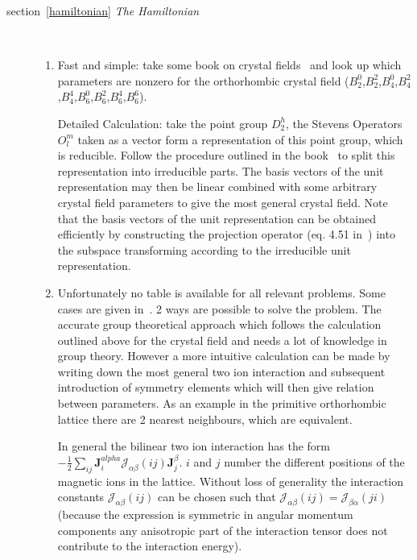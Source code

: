 \documentclass[twoside]{article}
\newcommand{\mbf}[1]{\mathbf #1}
\begin{document}
\begin{description}
\item[section~\ref{hamiltonian} {\em The Hamiltonian}] \ 
 \begin{enumerate}
 \item Fast and simple: take some book on crystal fields~\cite{hutchings64-227} and look up which parameters are nonzero 
 for the orthorhombic crystal field ($B_2^0$,$B_2^2$,$B_4^0$,$B_4^2$,$B_4^4$,$B_6^0$,$B_6^2$,$B_6^4$,$B_6^6$).

 Detailed Calculation: take the point group $D_2^h$, the Stevens Operators $O_l^m$ taken as a vector form
 a representation of this point group, which is reducible. Follow the procedure outlined in the book~\cite{elliott79-1}
 to split this representation into irreducible parts. The basis vectors of the unit representation may then be 
 linear combined with some arbitrary crystal field parameters to give the most general crystal field.
 Note that the basis vectors of the unit representation can be obtained efficiently by constructing the
 projection operator (eq. 4.51 in~\cite{elliott79-1})
  into the subspace transforming according to the irreducible unit representation. 
 \item Unfortunately no table is available for all relevant problems. Some cases are given in~\cite{morin90-1}.
 2 ways are possible to solve the problem. The accurate group theoretical approach which follows the calculation
 outlined above for the crystal field  and needs a lot of knowledge in group theory. However a more intuitive %
calculation
 can be made by writing down the most general two ion interaction and subsequent introduction of symmetry elements which
 will then give relation between parameters. As an example in the primitive orthorhombic lattice there are 2 nearest %
neighbours, which
 are equivalent. 

 In general the bilinear two ion interaction  has the form 
 $-\frac{1}{2}  \sum_{ij}  {\mbf J}_i^{alpha}{\mathcal J}_{\alpha\beta}(ij){\mbf J}_j^{\beta}$.
 $i$ and $j$ number the different positions of the magnetic ions in the lattice. Without loss of 
 generality the interaction constants ${\mathcal J}_{\alpha\beta}(ij)$ can be chosen such that
 ${\mathcal J}_{\alpha\beta}(ij)={\mathcal J}_{\beta\alpha}(ji)$ (because the expression is symmetric in
 angular momentum components any anisotropic part of the interaction tensor does not contribute to the
 interaction energy).  


\end{enumerate}
\end{description}
\end{document}
